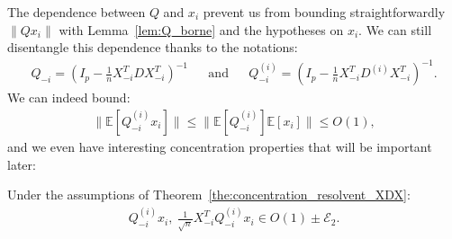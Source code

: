\documentclass[a4papaer, titlepage]{book}
\begin{document}
 The dependence between $Q$ and $x_i$ prevent us from bounding straightforwardly $\|Qx_i\|$ with Lemma~\ref{lem:Q_borne} and the hypotheses on $x_i$. We can still disentangle this dependence thanks to the notations: 
 \begin{align*}
   Q_{-i} = \left(I_p - \frac{1}{n}X_{-i}^TDX_{-i}^T\right)^{-1}&
   &\text{and}&
   &Q^{(i)}_{-i} = \left(I_p - \frac{1}{n}X_{-i}^TD^{(i)}X_{-i}^T\right)^{-1}.
 \end{align*}
 We can indeed bound:
 \begin{align}\label{eq:borne_Q_m_i_(i)_x_i}
   \|\mathbb E[Q_{-i}^{(i)}x_i]\| \leq \|\mathbb E[Q_{-i}^{(i)}]\mathbb E[x_i]\| \leq O(1),
 \end{align}
 and we even have interesting concentration properties that will be important later: 
 \begin{lemma}\label{lem:concentration_Q_m_i_x_i}
   Under the assumptions of Theorem~\ref{the:concentration_resolvent_XDX}:
   \begin{align*}
      Q^{(i)}_{-i}x_i, \
      \frac{1}{\sqrt n}X_{-i}^TQ^{(i)}_{-i}x_i \in O(1) \pm \mathcal E_2.
    \end{align*} 
 \end{lemma}
\end{document}
